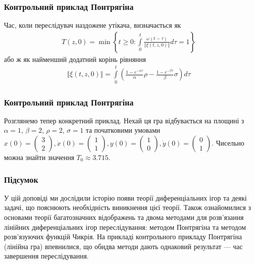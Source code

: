\documentclass[10pt,pdf]{beamer}
\renewcommand{\d}[1]{\dot{#1}}
\renewcommand{\l}{\left}
\renewcommand{\r}{\right}
\newcommand{\norm}[1]{\left\Vert #1 \right\Vert}
\newcommand{\intl}{\int\limits}
\begin{document}
    \begin{frame}
        \frametitle{Контрольний приклад Понтрягіна}
    
        Час, коли переслідувач наздожене утікача, визначається як
        \begin{gather*}
            T(z, 0) = \min \l\{ t\geq 0 : \intl_0^t \frac{\omega(t-\tau)}{\norm{\xi(t, z, 0)}} d\tau = 1 \r\}
        \end{gather*}
        або ж як найменший додатний корінь рівняння
        \begin{gather*}
            \norm{\xi(t, z, 0)} = \intl_0^t \l(\frac{1 - e^{-\alpha \tau}}{\alpha} \rho - \frac{1 - e^{-\beta \tau}}{\beta} \sigma\r) d\tau
        \end{gather*}
    
    \end{frame}
    \begin{frame}
        \frametitle{Контрольний приклад Понтрягіна}
    
        Розглянемо тепер конкретний приклад. Нехай ця гра відбувається на площині з 
        $\alpha=1$, $\beta=2$, $\rho=2$, $\sigma=1$ та
        початковими умовами $x(0) = \begin{pmatrix}
            3 \\ 2
        \end{pmatrix}, \d{x}(0) = \begin{pmatrix}
            1 \\ 1
        \end{pmatrix}, y(0) = \begin{pmatrix}
            1 \\ 0
        \end{pmatrix}, \d{y}(0) = \begin{pmatrix}
            0 \\ 1
        \end{pmatrix}$.
        Чисельно можна знайти значення $T_0 \approx 3.715$.
        \begin{center}
            \resizebox{160pt}{!}{
                
            }
        \end{center}
    
    \end{frame}
    \begin{frame}
        \frametitle{Підсумок}
        У цій доповіді ми дослідили історію появи теорії диференціальних ігор та деякі
        задачі, що пояснюють необхідність виникнення цієї теорії. Також ознайомилися з основами теорії багатозначних відображень та
        двома методами для розв'язання лінійних диференціальних ігор переслідування: методом Понтрягіна та
        методом розв'язуючих функцій Чикрія. На прикладі контрольного прикладу Понтрягіна (лінійна гра)
        впевнилися, що обидва методи дають однаковий результат --- час завершення переслідування.
    \end{frame}
\end{document}
